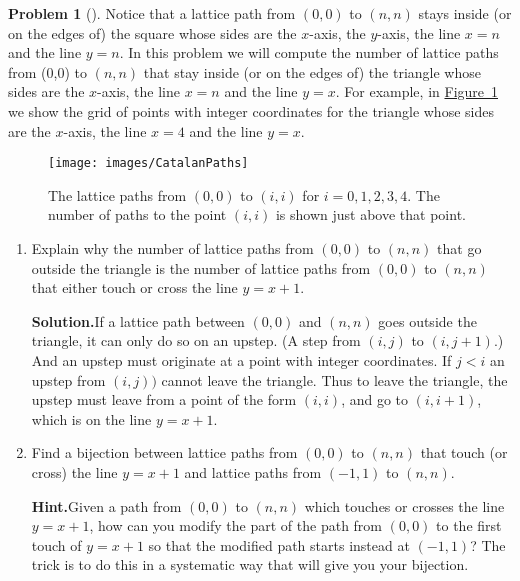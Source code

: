 \documentclass[10pt,]{book}
\theoremstyle{plain}
\theoremstyle{definition}
\newtheorem{activity}[project]{Problem}
\theoremstyle{definition}
\numberwithin{equation}{chapter}
\newcommand{\lt}{<}
\begin{document}
\begin{activity}[]\label{activity-51}
Notice that a lattice path from \((0,0)\) to \((n,n)\) stays inside (or on the edges of) the square whose sides are the \(x\)-axis, the \(y\)-axis, the line \(x=n\) and the line \(y=n\). In this problem we will compute the number of lattice paths from (0,0) to \((n,n)\) that stay inside (or on the edges of) the triangle whose sides are the \(x\)-axis, the line \(x=n\) and the line \(y=x\). For example, in \hyperref[CatalanPaths]{Figure~\ref{CatalanPaths}} we show the grid of points with integer coordinates for the triangle whose sides are the \(x\)-axis, the line \(x=4\) and the line \(y=x\).%
\begin{figure}
\centering
\texttt{[image: images/CatalanPaths]}
\caption{The lattice paths from \((0,0)\) to \((i,i)\) for \(i=0,1,2,3,4\).  The number of paths to the point \((i,i)\) is shown just above that point.\label{CatalanPaths}}
\end{figure}
\begin{enumerate}[font=\bfseries,label=(\alph*),ref=\alph*]
\item\label{task-52} Explain why the number of lattice paths from \((0,0)\) to \((n,n)\) that go outside the triangle is the number of lattice paths from \((0,0)\) to \((n,n)\) that either touch or cross the line \(y=x+1\).%
\par\medskip\noindent%
\textbf{Solution.}\quad If a lattice path between \((0,0)\) and \((n,n)\) goes outside the triangle, it can only do so on an upstep. (A step from \((i,j)\) to \((i,j+1)\).) And an upstep must originate at a point with integer coordinates. If \(j\lt i\) an upstep from \((i,j))\) cannot leave the triangle. Thus to leave the triangle, the upstep must leave from a point of the form \((i,i)\), and go to \((i,i+1)\), which is on the line \(y=x+1\).%
\item\label{task-53} Find a bijection between lattice paths from \((0,0)\) to \((n,n)\) that touch (or cross) the line \(y=x+1\) and lattice paths from \((-1,1)\) to \((n,n)\).%
\par\medskip\noindent%
\textbf{Hint.}\quad Given a path from \((0, 0)\) to \((n, n)\) which touches or crosses the line \(y = x + 1\), how can you modify the part of the path from \((0, 0)\) to the first touch of \(y = x + 1\) so that the modified path starts instead at \((-1, 1)\)? The trick is to do this in a systematic way that will give you your bijection.%
\par\medskip\noindent%

\end{enumerate}
\end{activity}
\end{document}
